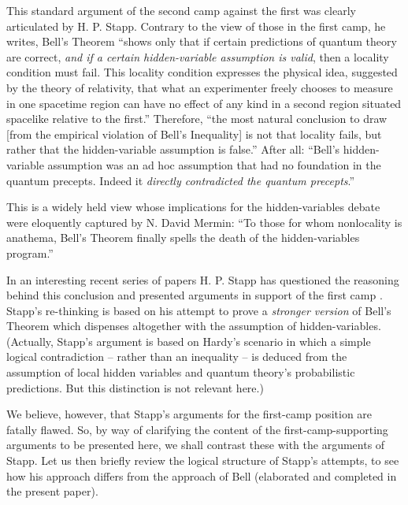\documentclass[aps,prc,onecolumn,12pt]{revtex4-2}
\begin{document}
This standard argument of the second camp against the first
was clearly articulated by H. P. Stapp.  Contrary to the view of
those in the first camp, he writes, Bell's Theorem ``shows only that if
certain predictions of quantum theory are correct, \emph{and if a certain
hidden-variable assumption is valid}, then a locality condition
must fail.  This locality condition expresses the physical idea,
suggested by the theory of relativity, that what an experimenter
freely chooses to measure in one spacetime region can have no effect
of any kind in a second region situated spacelike relative to the
first.''  Therefore,
``the most natural conclusion to draw [from the empirical violation of
Bell's Inequality] is not that locality fails, but
rather that the hidden-variable assumption is false.''  After all:
``Bell's
hidden-variable assumption was an ad hoc assumption that had no
foundation in the quantum precepts.  Indeed it \emph{directly
contradicted the quantum precepts}.''  \cite{stapp:btwhv}

This is a widely held view whose implications for the hidden-variables
debate were eloquently captured by N. David Mermin:  ``To
those for whom nonlocality is anathema, Bell's Theorem finally spells
the death of the hidden-variables program.'' \cite{merminquote}

In an interesting recent series of papers
H. P. Stapp has questioned the reasoning behind this
conclusion and presented arguments in support of the first camp
\cite{stapp:btwhv,stapp1,stapp2}.
Stapp's re-thinking is based on his attempt to
prove a \emph{stronger version} of Bell's Theorem which dispenses
altogether with the assumption of hidden-variables.
(Actually, Stapp's argument is based on Hardy's scenario \cite{hardy}
in which a simple logical contradiction -- rather than an inequality
-- is deduced from the assumption of
local hidden variables and quantum theory's probabilistic
predictions.  But this distinction is not relevant here.)

We believe, however, that Stapp's arguments for the first-camp
position are fatally flawed.  So, by way of clarifying the content of
the first-camp-supporting arguments to be presented here, we shall
contrast these with the arguments of Stapp.  Let us then briefly
review the logical structure of Stapp's attempts, to see how his
approach differs from the approach of Bell (elaborated and completed
in the present paper).
\end{document}
